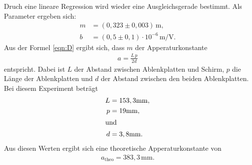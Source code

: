 Druch eine lineare Regression wird wieder eine Ausgleichsgerade bestimmt.
Als Parameter ergeben sich:
\begin{align*}
  m&=(0,323\pm0,003)\,\si{\meter},\\
  b&=(0,5\pm0,1)\cdot10^{-6}\,\si{\meter\per\volt}.
\end{align*}
Aus der Formel
\eqref{eqn:D} ergibt sich, dass $m$ der Apperaturkonstante
\begin{align*}
  a=\frac{L\,p}{2d}
\end{align*}
entspricht.
Dabei ist $L$ der Abstand zwischen Ablenkplatten und Schirm,
$p$ die Länge der Ablenkplatten und $d$ der Abstand zwischen den
beiden Ablenkplatten.
Bei diesem Experiment beträgt
\begin{align*}
  L&=153,3\si{\milli\meter},\\
  p&=19\si{\milli\meter},\\
\shortintertext{und}
  d&=3,8\si{\milli\meter}.
\end{align*}
Aus diesen Werten ergibt sich eine theoretische Apperaturkonstante
von
\begin{align*}
  a_\mathrm{theo}=383,3\,\si{\milli\meter}.
\end{align*}

